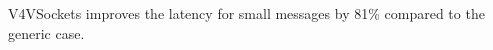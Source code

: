 \documentclass[a0paper,portrait,final]{baposter}
\begin{document}
\begin{poster}
{%
\begin{multicols}{2}

\hspace{0.5em}

\hspace{0.5em}

\hspace{0.5em}


\renewcommand{\thefootnote}{\roman{footnote}}

V4VSockets improves the latency for small messages by 81\% compared to the
generic case. 


\end{multicols}}
\end{poster}
\end{document}
